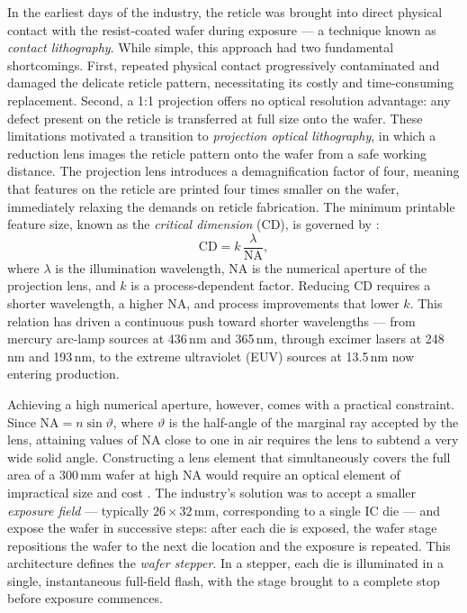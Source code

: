 \documentclass[11pt]{article}
\theoremstyle{definition}
\begin{document}
In the earliest days of the industry, the reticle was brought into direct physical contact with the resist-coated wafer during exposure — a technique known as \textit{contact lithography}. While simple, this approach had two fundamental shortcomings. First, repeated physical contact progressively contaminated and damaged the delicate reticle pattern, necessitating its costly and time-consuming replacement. Second, a 1:1 projection offers no optical resolution advantage: any defect present on the reticle is transferred at full size onto the wafer. These limitations motivated a transition to \textit{projection optical lithography}, in which a reduction lens images the reticle pattern onto the wafer from a safe working distance. The projection lens introduces a demagnification factor of four, meaning that features on the reticle are printed four times smaller on the wafer, immediately relaxing the demands on reticle fabrication. The minimum printable feature size, known as the \textit{critical dimension} (CD), is governed by \cite{Schmidt2012_UltraPrecision}:
\begin{equation}
    \mathrm{CD} = k\,\frac{\lambda}{\mathrm{NA}},
    \label{eq:rayleigh}
\end{equation}
where $\lambda$ is the illumination wavelength, $\mathrm{NA}$ is the numerical aperture of the projection lens, and $k$ is a process-dependent factor. Reducing CD requires a shorter wavelength, a higher NA, and process improvements that lower $k$. This relation has driven a continuous push toward shorter wavelengths — from mercury arc-lamp sources at 436\,nm and 365\,nm, through excimer lasers at 248\,nm and 193\,nm, to the extreme ultraviolet (EUV) sources at 13.5\,nm now entering production.

Achieving a high numerical aperture, however, comes with a practical constraint. Since $\mathrm{NA} = n\sin\vartheta$, where $\vartheta$ is the half-angle of the marginal ray accepted by the lens, attaining values of NA close to one in air requires the lens to subtend a very wide solid angle. Constructing a lens element that simultaneously covers the full area of a 300\,mm wafer at high NA would require an optical element of impractical size and cost \cite{Schmidt2012_UltraPrecision}. The industry's solution was to accept a smaller \textit{exposure field} — typically $26 \times 32$\,mm, corresponding to a single IC die — and expose the wafer in successive steps: after each die is exposed, the wafer stage repositions the wafer to the next die location and the exposure is repeated. This architecture defines the \textit{wafer stepper}. In a stepper, each die is illuminated in a single, instantaneous full-field flash, with the stage brought to a complete stop before exposure commences.
\end{document}
